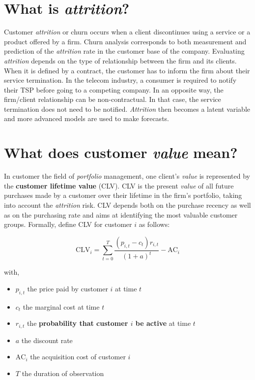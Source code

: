 \documentclass[
]{book}
\providecommand{\tightlist}{%
  \setlength{\itemsep}{0pt}\setlength{\parskip}{0pt}}
\begin{document}
\hypertarget{attritiondef}{%
\section{\texorpdfstring{What is \emph{attrition}?}{What is attrition?}}\label{attritiondef}}

Customer \emph{attrition} or churn occurs when a client discontinues using a service or a product offered by a firm. Churn analysis corresponds to both measurement and prediction of the \emph{attrition} rate in the customer base of the company. Evaluating \emph{attrition} depends on the type of relationship between the firm and its clients. When it is defined by a contract, the customer has to inform the firm about their service termination. In the telecom industry, a consumer is required to notify their TSP before going to a competing company. In an opposite way, the firm/client relationship can be non-contractual. In that case, the service termination does not need to be notified. \emph{Attrition} then becomes a latent variable and more advanced models are used to make forecasts.

\hypertarget{valuedef}{%
\section{\texorpdfstring{What does customer \emph{value} mean?}{What does customer value mean?}}\label{valuedef}}

In customer the field of \emph{portfolio} management, one client's \emph{value} is represented by the \textbf{customer lifetime value} (CLV). CLV is the present \emph{value} of all future purchases made by a customer over their lifetime in the firm's portfolio, taking into account the \emph{attrition} risk. CLV depends both on the purchase recency as well as on the purchasing rate and aims at identifying the most valuable customer groups. Formally, \citet{CUSTOMERS_ASSETS} define CLV for customer \(i\) as follows:

\begin{equation}
  \text{CLV}_i = \sum_{t=0}^{T} \frac{(p_{i,t} - c_t)r_{i,t}}{(1+a)^t} - \text{AC}_i
  \label{eq:clv}
\end{equation}

with,

\begin{itemize}
\tightlist
\item
  \(p_{i,t}\) the price paid by customer \(i\) at time \(t\)
\item
  \(c_t\) the marginal cost at time \(t\)
\item
  \(r_{i,t}\) the \textbf{probability that customer \(i\) be active} at time \(t\)
\item
  \(a\) the discount rate
\item
  \(\text{AC}_i\) the acquisition cost of customer \(i\)
\item
  \(T\) the duration of observation
\end{itemize}
\end{document}
